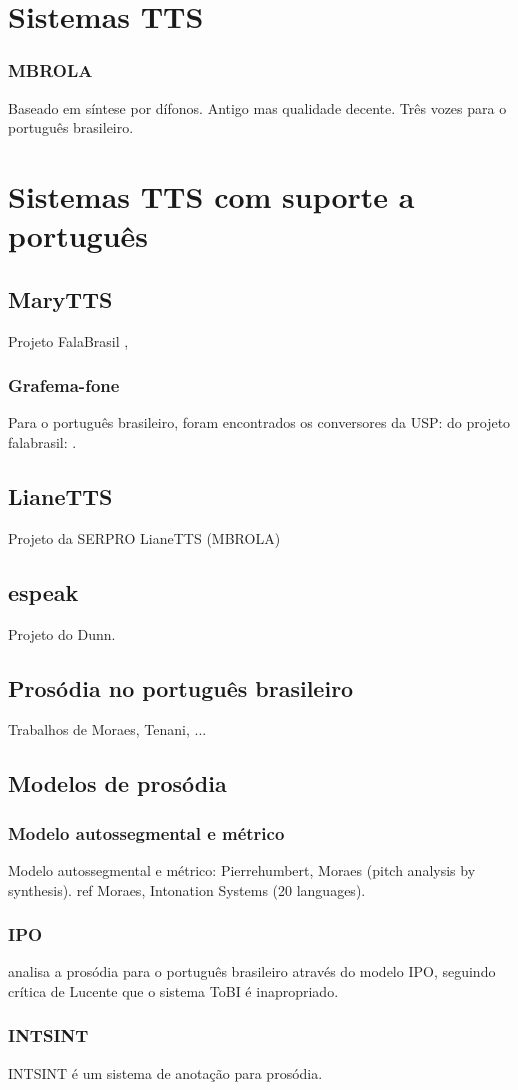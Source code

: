 \section{Sistemas TTS}
\subsubsection{MBROLA}
Baseado em síntese por dífonos. Antigo mas qualidade decente. Três vozes para o português brasileiro.

\section{Sistemas TTS com suporte a português}
\subsection{MaryTTS}
Projeto FalaBrasil \cite{falabrasil}, \cite{couto}
\subsubsection{Grafema-fone}
Para o português brasileiro, foram encontrados os conversores
da USP: \cite{g2pusp} do projeto falabrasil: \cite{falabrasil}.
\subsection{LianeTTS}
Projeto da SERPRO LianeTTS (MBROLA)
\subsection{espeak}
Projeto do Dunn.

\subsection{Prosódia no português brasileiro}
Trabalhos de Moraes, Tenani, ...
\subsection{Modelos de prosódia}
\subsubsection{Modelo autossegmental e métrico}
Modelo autossegmental e métrico: Pierrehumbert, Moraes (pitch analysis by synthesis).
ref Moraes, Intonation Systems (20 languages).
\subsubsection{IPO}
\cite{ipo} analisa a prosódia para o português brasileiro através do modelo IPO,
seguindo crítica de Lucente que o sistema ToBI é inapropriado.
\subsubsection{INTSINT}
INTSINT é um sistema de anotação para prosódia.
